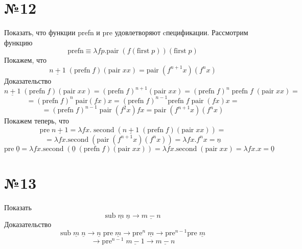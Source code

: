 \documentclass[a4paper,14pt]{scrreprt}
\newcommand{\lmd}{\lambda}
\begin{document}
\section*{№12}
Показать, что функции prefn и pre удовлетворяют cпецификации. Рассмотрим функцию 
$$\text{prefn} \equiv \lmd fp. \text{pair} \; (f(\text{first} \; p))(\text{first} \; p) $$
Покажем, что 
$$ \underline{n+1} \; (\text{prefn} \; f) (\text{pair} \; xx) = \text{pair} \; (f^{n+1}x) (f^{n}x) $$
Доказательство
$$ \underline{n+1} \; (\text{prefn} \; f) (\text{pair} \; xx) = 
(\text{prefn} \; f)^{n+1} (\text{pair} \; xx) = 
(\text{prefn} \; f)^{n} \; \text{prefn} \; f \; (\text{pair} \; xx) =$$
$$ = (\text{prefn} \; f)^{n} \; \text{pair} (fx)x = 
(\text{prefn} \; f)^{n-1} \text{prefn} \; f \; \text{pair} \; (fx)x = $$
$$ = (\text{prefn} \; f)^{n-1} \; \text{pair} \; (f^2 x) fx =  \text{pair} \; (f^{n+1}x) (f^{n}x) $$
Покажем теперь, что 
$$ \text{pre} \; \underline{n+1} = \lmd fx. \; \text{second} \;(\underline{n+1} \; (\text{prefn} \; f)(\text{pair} \;xx)) = $$
$$ = \lmd fx. \text{second} \; (\text{pair} \; (f^{n+1}x) (f^nx)) 
=  \lmd fx.f^nx = \underline{n}$$ 
$$ \text{pre} \; \underline{0} = \lmd fx. \text{second} \; (\underline{0} \; (\text{prefn} \; f)(\text{pair} \; xx)) =  
\lmd fx.\text{second} \; (\text{pair} \; xx) = \lmd fx.x = \underline{0} $$ 

\section*{№13}
Показать
$$ \text{sub} \; \underline{m} \; \underline{n} \rightarrow \underline{m - n}$$
Доказательство
$$ \text{sub} \; \underline{m} \; \underline{n} \rightarrow \underline{n} \; \text{pre} \; \underline{m} 
 \rightarrow \text{pre}^{n} \; \underline{m} \rightarrow \text{pre}^{n-1} \text{pre} \; \underline{m}  $$
$$ \rightarrow \text{pre}^{n-1} \; \underline{m-1} \rightarrow \underline{m - n}  $$
\end{document}
